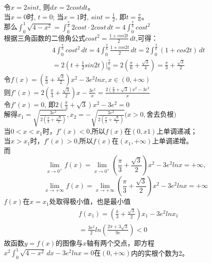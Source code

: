 \begin{solution}
    令\(x = 2sint\), 则\(dx = 2costdt\)。\\
    当\(x = 0\)时, \(t = 0\); 当\(x = 1\)时, \(sint = \frac{1}{2}\), 即\(t = \frac{\pi}{6}\)。\\
    那么\(\int_{0}^{1} \sqrt{4 - x^2} = \int_{0}^{\frac{\pi}{6}} 2cost \cdot 2cost \,dt = 4\int_{0}^{\frac{\pi}{6}} {cost}^2 \)\\
    根据三角函数的二倍角公式\({cost}^2 = \frac{1+cos2t}{2} \,dt\),可得：
    \begin{align*}
        &4\int_{0}^{\frac{\pi}{6}} {cost}^2 \,dt = 4\int_{0}^{\frac{\pi}{6}} \frac{1+cos2t}{2} \,dt = 2\int_{0}^{\frac{\pi}{6}} (1+cos2t) \,dt\\
        &=2\left(t + \frac{1}{2}sin2t\right)\bigg|_{0}^{\frac{\pi}{6}} = 2(\frac{\pi}{6} + \frac{\sqrt{3}}{4}) = \frac{\pi}{3} + \frac{\sqrt{3}}{2}
    \end{align*}
    令\(f(x) = \left(\frac{\pi}{3} + \frac{\sqrt{3}}{2}\right)x^2 - 3{e}^2lnx ,x \in (0, + \infty)\)\\
    则\(f\prime(x) = 2\left( \frac{\pi}{3} + \frac{\sqrt{3}}{2}\right)x - \frac{3{e}^2}{x} = \frac{2\left( \frac{\pi}{3} + \sqrt{3}\right)x^2 - 3{e}^2}{x}\)\\
    令\(f\prime(x) = 0\), 即\(2\left( \frac{\pi}{3} + \sqrt{3}\right)x^2 - 3{e}^2 = 0\)\\
    解得\(x_1 = \sqrt{\frac{3{e}^2}{2(\frac{\pi}{3} + \frac{\sqrt{3}}{2})}},x_2 = -\sqrt{\frac{3{e}^2}{2\left(\frac{\pi}{3} + \frac{\sqrt{3}}{2}\right)}} \text{($x >0,$舍去负根)}\)\\
    当\(0 < x < x_1\)时，\(f\prime(x) < 0\),所以\(f(x)\)在\((0, x1)\)上单调递减；\\
    当\(x > x_1\)时，\(f\prime(x) > 0\),所以\(f(x)\)在\((x_1, +\infty)\)上单调递增。\\
    而
    \[
    \lim_{x \to 0^+} f(x) = \lim_{x \to 0^+} (\frac{\pi}{3} + \frac{\sqrt{3}}{2})x^2 - 3e^2lnx = +\infty,
    \]
    \[
        \lim_{x \to +\infty} f(x) = \lim_{x\to+\infty} (\frac{\pi}{3} + \frac{\sqrt{3}}{2})x^2 - 3e^2lnx = +\infty
    \]
    \(f(x)\)在\(x = x_1\)处取得极小值，也是最小值
    \begin{align*}
        &f(x_1) = (\frac{\pi}{3} + \frac{\sqrt{3}}{2})x_1 - 3e^2lnx_1 \\
        &= \frac{3e^2}{2} ln\left(\frac{2\pi + 3\sqrt{3}}{9e}\right)<0
    \end{align*}
    故函数\( y =f(x)\)的图像与\(x\)轴有两个交点，即方程\(x^2\int_{0}^{1} \sqrt{4 - x^2} \,dx-3e^2lnx = 0\text{在}(0,+\infty)\)内的实根个数为2。
\end{solution}
